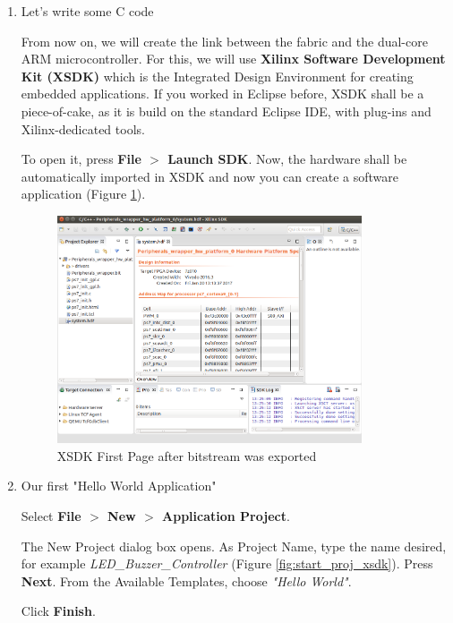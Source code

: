 \documentclass{article}
\begin{document}
\begin{itemize}
\begin{enumerate}
\newpage
 \item Let's write some C code 

From now on, we will create the link between the fabric and the dual-core ARM microcontroller. For this, we will use \textbf{Xilinx Software Development Kit (XSDK)} which is the Integrated Design Environment for creating embedded applications. If you worked in Eclipse before, XSDK shall be a piece-of-cake, as it is build on the standard Eclipse IDE, with plug-ins and Xilinx-dedicated tools. 

To open it, press \textbf{File $>$ Launch SDK}. Now, the hardware shall be automatically imported in XSDK and now you can create a software application (Figure \ref{fig:sdk_first_page}).



 
 \begin{figure}[h!]
    \centering
    \includegraphics[width=0.85\textwidth]{img/xsdk_first_page.png}
    \caption{XSDK First Page after bitstream was exported}
    \label{fig:sdk_first_page}
\end{figure}



 \item Our first "Hello World Application"

Select \textbf{File $>$ New $>$ Application Project}.

The New Project dialog box opens. As Project Name, type the name desired, for example
\textit{LED\_Buzzer\_Controller} (Figure \ref{fig:start_proj_xsdk}). Press \textbf{Next}. From the Available Templates, choose \textit{"Hello World"}. 

Click \textbf{Finish}. 



\end{enumerate}
\end{itemize}
\end{document}
